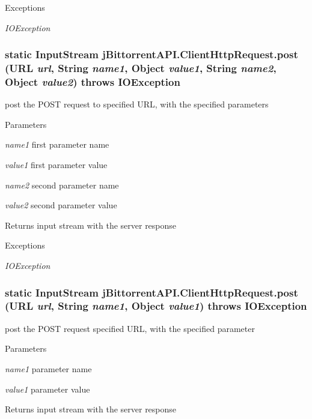 \begin{DoxyExceptions}{Exceptions}
\item[{\em IOException}]\end{DoxyExceptions}
\hypertarget{classj_bittorrent_a_p_i_1_1_client_http_request_a97d632b5157b69dd2ff00f171b89dab5}{
\subsubsection[{post}]{\setlength{\rightskip}{0pt plus 5cm}static InputStream jBittorrentAPI.ClientHttpRequest.post (URL {\em url}, \/  String {\em name1}, \/  Object {\em value1}, \/  String {\em name2}, \/  Object {\em value2})  throws IOException }}
\label{classj_bittorrent_a_p_i_1_1_client_http_request_a97d632b5157b69dd2ff00f171b89dab5}
post the POST request to specified URL, with the specified parameters 
\begin{DoxyParams}{Parameters}
\item[{\em name1}]first parameter name \item[{\em value1}]first parameter value \item[{\em name2}]second parameter name \item[{\em value2}]second parameter value \end{DoxyParams}
\begin{DoxyReturn}{Returns}
input stream with the server response 
\end{DoxyReturn}

\begin{DoxyExceptions}{Exceptions}
\item[{\em IOException}]\end{DoxyExceptions}
\hypertarget{classj_bittorrent_a_p_i_1_1_client_http_request_ab5c84f7a22e0839f9bae89bb8d0a804b}{
\subsubsection[{post}]{\setlength{\rightskip}{0pt plus 5cm}static InputStream jBittorrentAPI.ClientHttpRequest.post (URL {\em url}, \/  String {\em name1}, \/  Object {\em value1})  throws IOException }}
\label{classj_bittorrent_a_p_i_1_1_client_http_request_ab5c84f7a22e0839f9bae89bb8d0a804b}
post the POST request specified URL, with the specified parameter 
\begin{DoxyParams}{Parameters}
\item[{\em name1}]parameter name \item[{\em value1}]parameter value \end{DoxyParams}
\begin{DoxyReturn}{Returns}
input stream with the server response 
\end{DoxyReturn}

